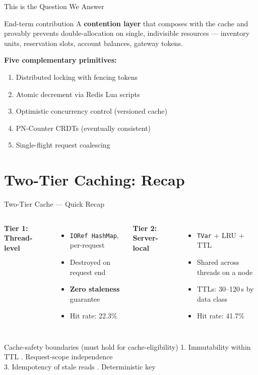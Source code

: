 \documentclass[aspectratio=169, 11pt]{beamer}
\begin{document}
\begin{frame}{This is the Question We Answer}
\begin{exampleblock}{End-term contribution}
A \textbf{contention layer} that composes with the cache and provably prevents double-allocation on single, indivisible resources --- inventory units, reservation slots, account balances, gateway tokens.
\end{exampleblock}
\vspace{0.5em}
\textbf{Five complementary primitives:}
\begin{enumerate}
    \item Distributed locking with fencing tokens
    \item Atomic decrement via Redis Lua scripts
    \item Optimistic concurrency control (versioned cache)
    \item PN-Counter CRDTs (eventually consistent)
    \item Single-flight request coalescing
\end{enumerate}
\end{frame}

\section{Two-Tier Caching: Recap}

\begin{frame}{Two-Tier Cache --- Quick Recap}
\begin{columns}[T, onlytextwidth]
\textbf{Tier 1: Thread-level}
\begin{itemize}
    \item \texttt{IORef HashMap}, per-request
    \item Destroyed on request end
    \item \textbf{Zero staleness} guarantee
    \item Hit rate: 22.3\%
\end{itemize}
\textbf{Tier 2: Server-local}
\begin{itemize}
    \item \texttt{TVar} + LRU + TTL
    \item Shared across threads on a node
    \item TTLs: 30--120\,s by data class
    \item Hit rate: 41.7\%
\end{itemize}
\end{columns}
\vspace{0.6em}
\begin{block}{Cache-safety boundaries (must hold for cache-eligibility)}
\small
1. Immutability within TTL . Request-scope independence \\
3. Idempotency of stale reads . Deterministic key
\end{block}
\end{frame}
\end{document}
